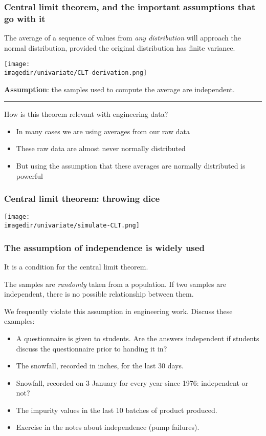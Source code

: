\begin{frame}\frametitle{Central limit theorem, \textbf{and} the important assumptions that go with it}
	\begin{block}
		{\color{purple}{Central limit theorem}}
		\begin{center}
			The average of a sequence of values from \emph{any distribution} will approach the normal distribution, provided the original distribution has finite variance.
		\end{center}
	\end{block}

	\texttt{[image: \\imagedir/univariate/CLT-derivation.png]}

	\textbf{Assumption}: the samples used to compute the average are independent.
	\vspace{4pt}
	\hrule
	\vspace{4pt}
	How is this theorem relevant with engineering data?
	\begin{itemize}
		\item	In many cases we are using averages from our raw data
		\item	These raw data are almost never normally distributed
		\item	But using the assumption that these averages are normally distributed is powerful
	\end{itemize}
\end{frame}

\begin{frame}\frametitle{Central limit theorem: throwing dice {\color{myGreen}{(independent events)}}}
	\texttt{[image: \\imagedir/univariate/simulate-CLT.png]}
\end{frame}

\begin{frame}\frametitle{The assumption of \textbf{independence} is widely used}

	It is a condition for the central limit theorem.
	\begin{block}
		{\color{purple}{Independence}}
		\begin{center}
			The samples are \emph{randomly} taken from a population. If two samples are independent, there is no possible relationship between them.
		\end{center}
	\end{block}

	We frequently violate this assumption in engineering work. Discuss these examples:
	\begin{itemize}
		\item	A questionnaire is given to students. Are the answers independent if students discuss the questionnaire prior to handing it in?
		\item	The snowfall, recorded in inches, for the last 30 days.
		\item	Snowfall, recorded on 3 January for every year since 1976: independent or not?
		\item	The impurity values in the last 10 batches of product produced.
		\item	Exercise in the notes about independence (pump failures).
	\end{itemize}
\end{frame}

